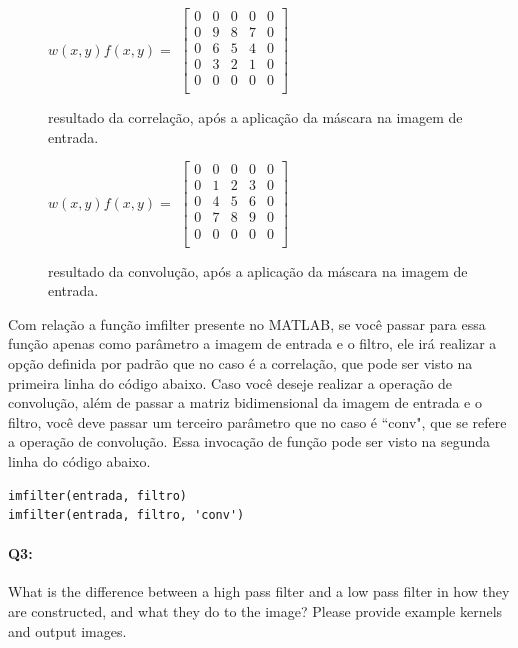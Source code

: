 \begin{figure}[!htb]
	\centering
	$ w(x, y) f(x, y) = $
	$
	\begin{bmatrix}
	    0 & 0 & 0 & 0 & 0 \\
	    0 & 9 & 8 & 7 & 0 \\
	    0 & 6 & 5 & 4 & 0 \\
	    0 & 3 & 2 & 1 & 0 \\
	    0 & 0 & 0 & 0 & 0 \\
	\end{bmatrix}
	$
	\caption{resultado da correlação, após a aplicação da máscara na imagem de entrada.}
\end{figure}

\begin{figure}[!htb]
	\centering
	$ w(x, y) f(x, y) = $
	$
	\begin{bmatrix}
	    0 & 0 & 0 & 0 & 0 \\
	    0 & 1 & 2 & 3 & 0 \\
	    0 & 4 & 5 & 6 & 0 \\
	    0 & 7 & 8 & 9 & 0 \\
	    0 & 0 & 0 & 0 & 0 \\
	\end{bmatrix}
	$
	\caption{resultado da convolução, após a aplicação da máscara na imagem de entrada.}
\end{figure}

Com relação a função imfilter presente no MATLAB, se você passar para essa função apenas como parâmetro a imagem de entrada e o filtro, ele irá realizar a opção definida por padrão que no caso é a correlação, que pode ser visto na primeira linha do código abaixo. Caso você deseje realizar a operação de convolução, além de passar a matriz bidimensional da imagem de entrada e o filtro, você deve passar um terceiro parâmetro que no caso é ``conv", que se refere a operação de convolução. Essa invocação de função pode ser visto na segunda linha do código abaixo.

\begin{lstlisting}[style=Matlab-editor]
imfilter(entrada, filtro)
imfilter(entrada, filtro, 'conv')
\end{lstlisting}


\pagebreak
\paragraph{Q3:} What is the difference between a high pass filter and a low pass filter in how they are constructed, and what they do to the image? Please provide example kernels and output images.

